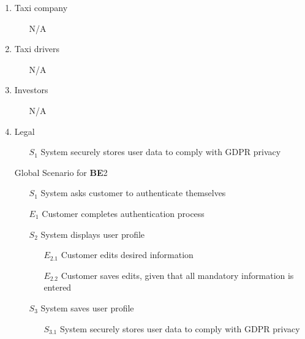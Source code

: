 \documentclass[]{article}
\begin{document}
\begin{enumerate}[{\textbf{BE}}1.]
\begin{enumerate}[{\textbf{VP2}}.1]
\begin{enumerate}
            \end{enumerate}
        \item Taxi company
            \begin{enumerate}
                \item[N/A]
            \end{enumerate}
        \item Taxi drivers
            \begin{enumerate}
                \item[N/A]
            \end{enumerate}
        \item Investors
            \begin{enumerate}
                \item[N/A]
            \end{enumerate}
        \item Legal
            \begin{enumerate}
                \item[$S_1$] System securely stores user data to comply with GDPR privacy
            \end{enumerate}
        \item[Global] Scenario for \textbf{BE}2
            \begin{enumerate}
                \item[$S_1$] System asks customer to authenticate themselves
                    \item[$E_1$] Customer completes authentication process
                \item[$S_2$] System displays user profile
                \begin{enumerate}
                    \item[$E_{2.1}$] Customer edits desired information
                    \item[$E_{2.2}$] Customer saves edits, given that all mandatory information is entered
                \end{enumerate}
                \item[$S_3$] System saves user profile
                \begin{enumerate}
                    \item[$S_{3.1}$] System securely stores user data to comply with GDPR privacy
                \end{enumerate}
            \end{enumerate}
    \end{enumerate}



\end{enumerate}
\end{document}
